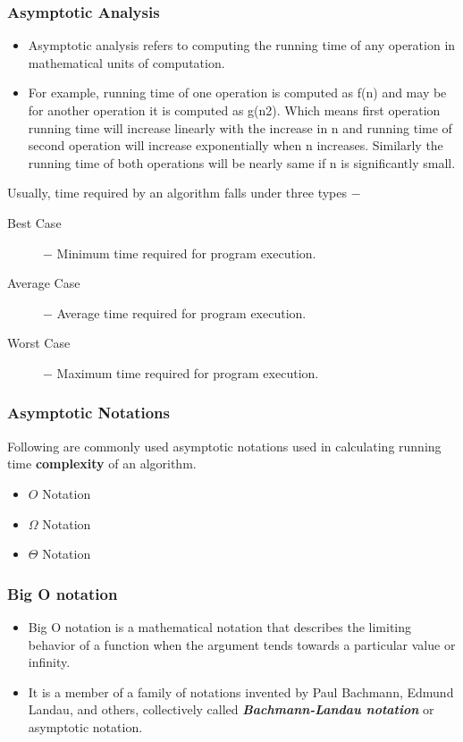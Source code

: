 \documentclass{beamer}
\begin{document}
\begin{frame}
	\frametitle{ Asymptotic Analysis}
		\large
	\begin{itemize}
		\item 
		Asymptotic analysis refers to computing the running time of any operation in mathematical units of computation. 
		\item For example, running time of one operation is computed as f(n) and may be for another operation it is computed as g(n2). Which means first operation running time will increase linearly with the increase in n and running time of second operation will increase exponentially when n increases. Similarly the running time of both operations will be nearly same if n is significantly small.
	\end{itemize}
\end{frame}
\begin{frame}
		\large
	Usually, time required by an algorithm falls under three types −
	\begin{description}
		\item[Best Case] − Minimum time required for program execution.
		
		\item[Average Case] − Average time required for program execution.
		
		\item[Worst Case] − Maximum time required for program execution.
	\end{description}
\end{frame}
\begin{frame}
	\frametitle{Asymptotic Notations}
	\large
	Following are commonly used asymptotic notations used in calculating running time \textbf{complexity} of an algorithm.
	
	\begin{itemize}
		\item $O$ Notation
		\item $\Omega$ Notation
		\item $\Theta$ Notation
	\end{itemize}
\end{frame}
\begin{frame}
	\frametitle{Big O notation}
	\large
	\begin{itemize}
		\item Big O notation is a mathematical notation that describes the limiting behavior of a function when the argument tends towards a particular value or infinity. 
		\item It is a member of a family of notations invented by Paul Bachmann, Edmund Landau, and others, collectively called \textbf{\textit{Bachmann-Landau notation}} or asymptotic notation.
	\end{itemize}
\end{frame}
\end{document}
